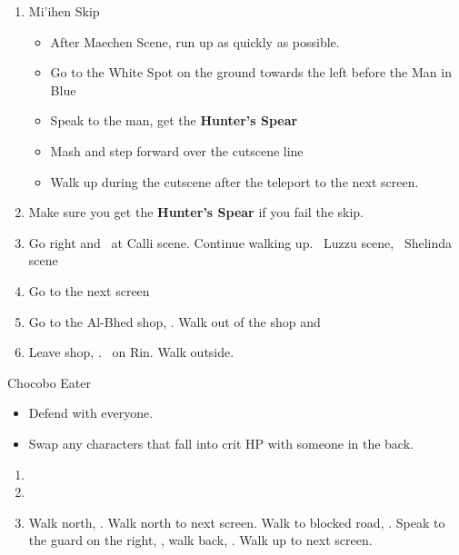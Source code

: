 \begin{enumerate}[resume]
    \item {Mi'ihen Skip}
    \begin{itemize}
        \item After Maechen Scene, run up as quickly as possible.
        \item Go to the White Spot on the ground towards the left before the Man in Blue
        \item Speak to the man, get the \textbf{Hunter's Spear}
        \item Mash and step forward over the cutscene line
        \item Walk up during the cutscene after the teleport to the next screen.
    \end{itemize}
    \item Make sure you get the \textbf{Hunter's Spear} if you fail the skip.
    \item Go right and \sd\ at Calli scene. Continue walking up. \sd\ Luzzu scene, \sd\ Shelinda scene
    \item Go to the next screen
    \item Go to the Al-Bhed shop, \sd. Walk out of the shop and \cs[5:30]
    \item Leave shop, \sd. \sd\ on Rin. Walk outside.
\end{enumerate}
\begin{battle}{Chocobo Eater}
    \begin{itemize}
        \tidusf Haste Boss
        \item Defend with everyone.
        \item Swap any characters that fall into crit HP with someone in the back.
    \end{itemize}
\end{battle}
\begin{enumerate}[resume]
    \item \sd
    \item \formation{\tidus}{\wakka}{\auron}
    \item Walk north, \save. Walk north to next screen. Walk to blocked road, \sd. Speak to the guard on the right, \sd, walk back, \sd. Walk up to next screen.
\end{enumerate}
